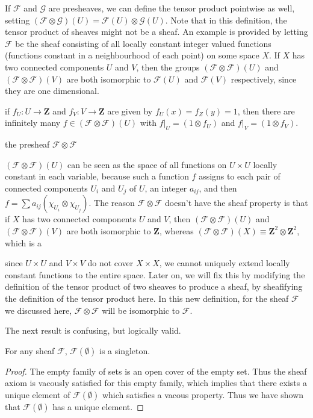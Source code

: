 \begin{example}
    If $\mathcal{F}$ and $\mathcal{G}$ are presheaves, we can define the tensor product pointwise as well, setting $(\mathcal{F} \otimes \mathcal{G})(U) = \mathcal{F}(U) \otimes \mathcal{G}(U)$. Note that in this definition, the tensor product of sheaves might not be a sheaf. An example is provided by letting $\mathcal{F}$ be the sheaf consisting of all locally constant integer valued functions (functions constant in a neighbourhood of each point) on some space $X$. If $X$ has two connected components $U$ and $V$, then the groups $(\mathcal{F} \otimes \mathcal{F})(U)$ and $(\mathcal{F} \otimes \mathcal{F})(V)$ are both isomorphic to $\mathcal{F}(U)$ and $\mathcal{F}(V)$ respectively, since they are one dimensional.

    if $f_U: U \to \mathbf{Z}$ and $f_V: V \to \mathbf{Z}$ are given by $f_U(x) = f_Z(y) = 1$, then there are infinitely many $f \in (\mathcal{F} \otimes \mathcal{F})(U)$ with $f|_U = (1 \otimes f_U)$ and $f|_V = (1 \otimes f_V)$.

    the presheaf $\mathcal{F} \otimes \mathcal{F}$

    $(\mathcal{F} \otimes \mathcal{F})(U)$ can be seen as the space of all functions on $U \times U$ locally constant in each variable, because such a function $f$ assigns to each pair of connected components $U_i$ and $U_j$ of $U$, an integer $a_{ij}$, and then $f = \sum a_{ij} (\chi_{U_i} \otimes \chi_{U_j})$. The reason $\mathcal{F} \otimes \mathcal{F}$ doesn't have the sheaf property is that if $X$ has two connected components $U$ and $V$, then $(\mathcal{F} \otimes \mathcal{F})(U)$ and $(\mathcal{F} \otimes \mathcal{F})(V)$ are both isomorphic to $\mathbf{Z}$, whereas $(\mathcal{F} \otimes \mathcal{F})(X) \equiv \mathbf{Z}^2 \otimes \mathbf{Z}^2$, which is a 

    since $U \times U$ and $V \times V$ do not cover $X \times X$, we cannot uniquely extend locally constant functions to the entire space. Later on, we will fix this by modifying the definition of the tensor product of two sheaves to produce a sheaf, by sheafifying the definition of the tensor product here. In this new definition, for the sheaf $\mathcal{F}$ we discussed here, $\mathcal{F} \otimes \mathcal{F}$ will be isomorphic to $\mathcal{F}$.
\end{example}

The next result is confusing, but logically valid.

\begin{lemma}
    For any sheaf $\mathcal{F}$, $\mathcal{F}(\emptyset)$ is a singleton.
\end{lemma}
\begin{proof}
    The empty family of sets is an open cover of the empty set. Thus the sheaf axiom is vacously satisfied for this empty family, which implies that there exists a unique element of $\mathcal{F}(\emptyset)$ which satisfies a vacous property. Thus we have shown that $\mathcal{F}(\emptyset)$ has a unique element.
\end{proof}

